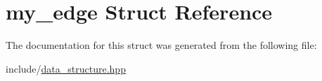 \hypertarget{structmy__edge}{
\section{my\_\-edge Struct Reference}
\label{structmy__edge}
}


The documentation for this struct was generated from the following file:\begin{DoxyCompactItemize}
\item 
include/\hyperlink{data__structure_8hpp}{data\_\-structure.hpp}\end{DoxyCompactItemize}

